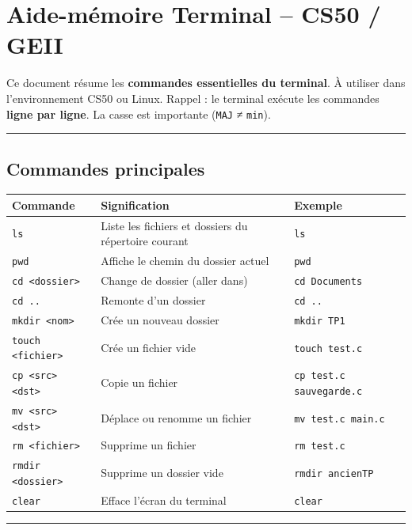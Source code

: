 \section{Aide-mémoire Terminal -- CS50 / GEII}

Ce document résume les \textbf{commandes essentielles du terminal}.
À utiliser dans l’environnement CS50 ou Linux.
Rappel : le terminal exécute les commandes \textbf{ligne par ligne}.
La casse est importante (\texttt{MAJ} ≠ \texttt{min}).
\hrule
\subsection{Commandes principales}

\begin{center}
	\begin{tabular}{|l|l|l|}
		\hline
		Commande                 & Signification                                        & Exemple                         \\
		\hline
		\texttt{ls}              & Liste les fichiers et dossiers du répertoire courant & \texttt{ls}                     \\
		\texttt{pwd}             & Affiche le chemin du dossier actuel                  & \texttt{pwd}                    \\
		\texttt{cd <dossier>}    & Change de dossier (aller dans)                       & \texttt{cd Documents}           \\
		\texttt{cd ..}           & Remonte d’un dossier                                 & \texttt{cd ..}                  \\
		\texttt{mkdir <nom>}     & Crée un nouveau dossier                              & \texttt{mkdir TP1}              \\
		\texttt{touch <fichier>} & Crée un fichier vide                                 & \texttt{touch test.c}           \\
		\texttt{cp <src> <dst>}  & Copie un fichier                                     & \texttt{cp test.c sauvegarde.c} \\
		\texttt{mv <src> <dst>}  & Déplace ou renomme un fichier                        & \texttt{mv test.c main.c}       \\
		\texttt{rm <fichier>}    & Supprime un fichier                                  & \texttt{rm test.c}              \\
		\texttt{rmdir <dossier>} & Supprime un dossier vide                             & \texttt{rmdir ancienTP}         \\
		\texttt{clear}           & Efface l’écran du terminal                           & \texttt{clear}                  \\
		\hline
	\end{tabular}
\end{center}
\hrule
